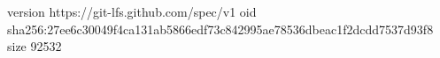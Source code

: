 version https://git-lfs.github.com/spec/v1
oid sha256:27ee6c30049f4ca131ab5866edf73c842995ae78536dbeac1f2dcdd7537d93f8
size 92532
